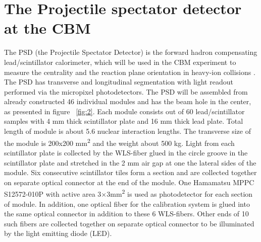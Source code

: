 \documentclass[a4paper,11pt]{article}
\begin{document}
\section{The Projectile spectator detector at the CBM}
The PSD (the Projectile Spectator Detector) is the forward hadron compensating lead/scintillator calorimeter, which will be used in the CBM experiment to measure the centrality and the reaction plane orientation in heavy-ion collisions \cite{3}. The PSD has transverse and longitudinal segmentation with light readout performed via the micropixel photodetectors. 
The PSD will be assembled from already constructed 46 individual modules and has the beam hole in the center, as presented in figure ~\ref{fig:2}. Each module consists out of 60 lead/scintillator samples with 4 mm thick scintillator plate and 16 mm thick lead plate. Total length of module is about 5.6 nuclear interaction lengths. The transverse size of the module is 200x200 mm\textsuperscript{2} and the weight about 500 kg. Light from each scintillator plate is collected by the WLS-fiber glued in the circle groove in the scintillator plate and stretched in the 2 mm air gap at one the lateral sides of the module. Six consecutive scintillator tiles form a section and are collected together on separate optical connector at the end of the module. One Hamamatsu MPPC S12572-010P with active area 3×3mm\textsuperscript{2} is used as photodetector for each section of module. In addition, one optical fiber for the calibration system is glued into the same optical connector in addition to these 6 WLS-fibers. Other ends of 10 such fibers are collected together on separate optical connector to be illuminated by the light emitting diode (LED). 
\end{document}
